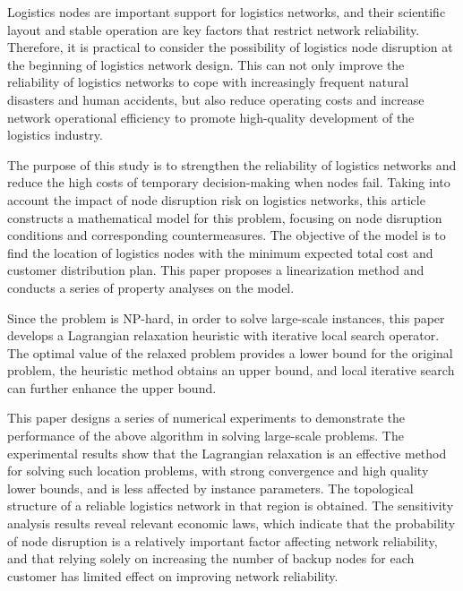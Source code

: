  \setlength{\baselineskip}{20pt}
\begin{englishabstract}
	
    Logistics nodes are important support for logistics networks, 
    and their scientific layout and stable operation are key 
    factors that restrict network reliability. 
    Therefore, it is practical to consider the possibility of logistics node 
    disruption at the beginning of logistics network design. 
    This can not only improve the reliability of logistics networks to cope 
    with increasingly frequent natural disasters and human accidents, 
    but also reduce operating costs and increase network operational efficiency 
    to promote high-quality development of the logistics industry.

    The purpose of this study is to strengthen the reliability of logistics 
    networks and reduce the high costs of temporary decision-making when nodes fail. 
    Taking into account the impact of node disruption risk on logistics networks, 
    this article constructs a mathematical model for this 
    problem, focusing on node disruption conditions and corresponding 
    countermeasures. The objective of the model is to find the
    location of logistics nodes with the minimum expected total cost and customer 
    distribution plan. This paper proposes a linearization method 
    and conducts a series of property analyses on the model.
    
    Since the problem is NP-hard, 
    in order to solve large-scale instances, this paper develops a 
    Lagrangian relaxation heuristic with iterative local search operator. 
    The optimal value of the relaxed problem provides a lower bound for the 
    original problem, the heuristic method obtains an upper bound, 
    and local iterative search can further enhance the upper bound.
    
    This paper designs a series of numerical experiments to demonstrate the 
    performance of the above algorithm in solving large-scale problems. 
    The experimental results show that the Lagrangian relaxation is 
    an effective method for solving such location problems, 
    with strong convergence and high quality lower bounds, 
    and is less affected by instance parameters. 
    The topological structure of a reliable logistics network in that region is obtained. 
    The sensitivity analysis results reveal relevant economic laws, 
    which indicate that the probability of node disruption is a relatively important 
    factor affecting network reliability, and that relying solely on increasing the 
    number of backup nodes for each customer has limited effect on improving network 
    reliability.
    


\noindent{}
\end{englishabstract}